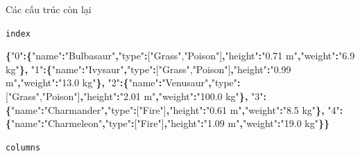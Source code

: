 \documentclass[
]{book}
\newenvironment{Shaded}{\begin{snugshade}}{\end{snugshade}}
\newcommand{\DataTypeTok}[1]{\textcolor[rgb]{0.13,0.29,0.53}{#1}}
\newcommand{\FunctionTok}[1]{\textcolor[rgb]{0.13,0.29,0.53}{\textbf{#1}}}
\newcommand{\OtherTok}[1]{\textcolor[rgb]{0.56,0.35,0.01}{#1}}
\newcommand{\StringTok}[1]{\textcolor[rgb]{0.31,0.60,0.02}{#1}}
\begin{document}
Các cấu trúc còn lại

\texttt{index}

\begin{Shaded}
\begin{Highlighting}[]
\FunctionTok{\{}\DataTypeTok{"0"}\FunctionTok{:\{}\DataTypeTok{"name"}\FunctionTok{:}\StringTok{"Bulbasaur"}\FunctionTok{,}\DataTypeTok{"type"}\FunctionTok{:}\OtherTok{[}\StringTok{"Grass"}\OtherTok{,}\StringTok{"Poison"}\OtherTok{]}\FunctionTok{,}\DataTypeTok{"height"}\FunctionTok{:}\StringTok{"0.71 m"}\FunctionTok{,}\DataTypeTok{"weight"}\FunctionTok{:}\StringTok{"6.9 kg"}\FunctionTok{\},}
\DataTypeTok{"1"}\FunctionTok{:\{}\DataTypeTok{"name"}\FunctionTok{:}\StringTok{"Ivysaur"}\FunctionTok{,}\DataTypeTok{"type"}\FunctionTok{:}\OtherTok{[}\StringTok{"Grass"}\OtherTok{,}\StringTok{"Poison"}\OtherTok{]}\FunctionTok{,}\DataTypeTok{"height"}\FunctionTok{:}\StringTok{"0.99 m"}\FunctionTok{,}\DataTypeTok{"weight"}\FunctionTok{:}\StringTok{"13.0 kg"}\FunctionTok{\},}
\DataTypeTok{"2"}\FunctionTok{:\{}\DataTypeTok{"name"}\FunctionTok{:}\StringTok{"Venusaur"}\FunctionTok{,}\DataTypeTok{"type"}\FunctionTok{:}\OtherTok{[}\StringTok{"Grass"}\OtherTok{,}\StringTok{"Poison"}\OtherTok{]}\FunctionTok{,}\DataTypeTok{"height"}\FunctionTok{:}\StringTok{"2.01 m"}\FunctionTok{,}\DataTypeTok{"weight"}\FunctionTok{:}\StringTok{"100.0 kg"}\FunctionTok{\},}
\DataTypeTok{"3"}\FunctionTok{:\{}\DataTypeTok{"name"}\FunctionTok{:}\StringTok{"Charmander"}\FunctionTok{,}\DataTypeTok{"type"}\FunctionTok{:}\OtherTok{[}\StringTok{"Fire"}\OtherTok{]}\FunctionTok{,}\DataTypeTok{"height"}\FunctionTok{:}\StringTok{"0.61 m"}\FunctionTok{,}\DataTypeTok{"weight"}\FunctionTok{:}\StringTok{"8.5 kg"}\FunctionTok{\},}
\DataTypeTok{"4"}\FunctionTok{:\{}\DataTypeTok{"name"}\FunctionTok{:}\StringTok{"Charmeleon"}\FunctionTok{,}\DataTypeTok{"type"}\FunctionTok{:}\OtherTok{[}\StringTok{"Fire"}\OtherTok{]}\FunctionTok{,}\DataTypeTok{"height"}\FunctionTok{:}\StringTok{"1.09 m"}\FunctionTok{,}\DataTypeTok{"weight"}\FunctionTok{:}\StringTok{"19.0 kg"}\FunctionTok{\}\}}
\end{Highlighting}
\end{Shaded}

\texttt{columns}
\end{document}
